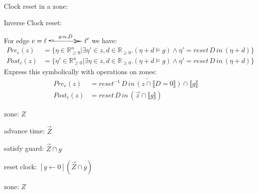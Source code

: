 \documentclass[a4paper, 10pt]{article}
\begin{document}
\begin{mdframed}
\begin{multicols}{2}
Clock reset in a zone:
\begin{center}
\scalebox{.7}{}
\end{center}
Inverse Clock reset:
\begin{center}
\scalebox{.7}{}
\end{center}
\end{multicols}
For edge $e=\ell\overset{g:\alpha, D}{\scalebox{5}[1]{$\hookrightarrow$}}\ell'$ we have:
\begin{align*}
Pre_e(z) &= \{ \eta\in\mathds{R}^n_{\geq0} | \exists\eta'\in z,d\in\mathds{R}_{\geq0}.(\eta+d\models g)\wedge\eta' = reset\,D\,in\, (\eta+d)\} \\
Post_e(z) &= \{ \eta'\in\mathds{R}^n_{\geq0} | \exists\eta\in z,d\in\mathds{R}_{\geq0}.(\eta+d\models g)\wedge\eta' = reset\,D\,in\, (\eta+d)\}
\end{align*}
Express this symbolically with operations on zones:
\begin{align*}
Pre_e(z)  &= \overleftarrow{reset^{-1}\,D\,in\,(z\cap\llbracket D=0\rrbracket)\cap\llbracket g\rrbracket} \\
Post_e(z) &= reset\,D\,in\,(\overrightarrow{z}\cap\llbracket g\rrbracket)
\end{align*}
\begin{multicols}{2}
zone: $Z$
\begin{center}
\scalebox{.7}{}
\end{center}
advance time: $\overrightarrow{Z}$
\begin{center}
\scalebox{.7}{}
\end{center}
\columnbreak
satisfy guard: $\overrightarrow{Z}\cap g$
\begin{center}
\scalebox{.7}{}
\end{center}
reset clock: $[y\leftarrow0](\overrightarrow{Z}\cap g)$
\begin{center}
\scalebox{.7}{}
\end{center}
\end{multicols}
\begin{multicols}{2}
zone: $Z$
\begin{center}
\scalebox{.7}{}
\end{center}

\end{multicols}
\end{mdframed}
\end{document}
